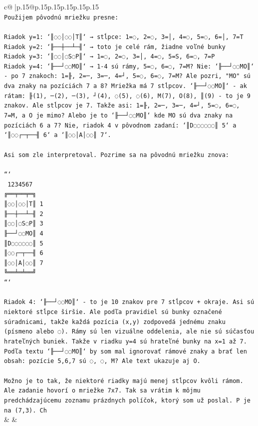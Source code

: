 \documentclass{article}
\begin{document}
{\begin{supertabular}{c@{$\;$}|p{.15\linewidth}@{}p{.15\linewidth}p{.15\linewidth}p{.15\linewidth}p{.15\linewidth}p{.15\linewidth}}
{{{\\ 
\texttt{Použijem pôvodnú mriežku presne:} \\
\\ 
\texttt{Riadok y=1: `║◌◌│◌◌│T║` → stĺpce: 1=◌, 2=◌, 3=│, 4=◌, 5=◌, 6=│, 7=T} \\
\texttt{Riadok y=2: `╟──┼──┴─╢` → toto je celé rám, žiadne voľné bunky} \\
\texttt{Riadok y=3: `║◌◌│◌S◌P║` → 1=◌, 2=◌, 3=│, 4=◌, 5=S, 6=◌, 7=P} \\
\texttt{Riadok y=4: `╟──┘◌◌MO║` → 1{-}4 sú rámy, 5=◌, 6=◌, 7=M? Nie: `╟──┘◌◌MO║` {-} po 7 znakoch: 1=╟, 2=─, 3=─, 4=┘, 5=◌, 6=◌, 7=M? Ale pozri, "MO" sú dva znaky na pozíciách 7 a 8? Mriežka má 7 stĺpcov. `╟──┘◌◌MO║` {-} ak rátam: ╟(1), ─(2), ─(3), ┘(4), ◌(5), ◌(6), M(7), O(8), ║(9) {-} to je 9 znakov. Ale stĺpcov je 7. Takže asi: 1=╟, 2=─, 3=─, 4=┘, 5=◌, 6=◌, 7=M, a O je mimo? Alebo je to `╟──┘◌◌MO║` kde MO sú dva znaky na pozíciách 6 a 7? Nie, riadok 4 v pôvodnom zadaní: `║D◌◌◌◌◌◌║ 5` a `║◌◌┌─┬──╢ 6` a `║◌◌│A│◌◌║ 7`. } \\
\\ 
\texttt{Asi som zle interpretoval. Pozrime sa na pôvodnú mriežku znova:} \\
\\ 
\texttt{```} \\
\texttt{ 1234567} \\
\texttt{╔══╤══╤═╗} \\
\texttt{║◌◌│◌◌│T║ 1} \\
\texttt{╟──┼──┴─╢ 2} \\
\texttt{║◌◌│◌S◌P║ 3} \\
\texttt{╟──┘◌◌MO║ 4} \\
\texttt{║D◌◌◌◌◌◌║ 5} \\
\texttt{║◌◌┌─┬──╢ 6} \\
\texttt{║◌◌│A│◌◌║ 7} \\
\texttt{╚══╧═╧══╝} \\
\texttt{```} \\
\\ 
\texttt{Riadok 4: `╟──┘◌◌MO║` {-} to je 10 znakov pre 7 stĺpcov + okraje. Asi sú niektoré stĺpce širšie. Ale podľa pravidiel sú bunky označené súradnicami, takže každá pozícia (x,y) zodpovedá jednému znaku (písmeno alebo ◌). Rámy sú len vizuálne oddelenia, ale nie sú súčasťou hrateľných buniek. Takže v riadku y=4 sú hrateľné bunky na x=1 až 7. Podľa textu `╟──┘◌◌MO║` by som mal ignorovať rámové znaky a brať len obsah: pozície 5,6,7 sú ◌, ◌, M? Ale text ukazuje aj O. } \\
\\ 
\texttt{Možno je to tak, že niektoré riadky majú menej stĺpcov kvôli rámom. Ale zadanie hovorí o mriežke 7x7. Tak sa vrátim k môjmu predchádzajúcemu zoznamu prázdnych políčok, ktorý som už poslal. P je na (7,3). Ch} \\
            }
        }
    }
    & & \\ \\


\end{supertabular}}
\end{document}
